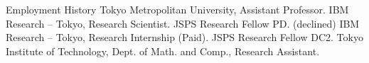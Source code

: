 \begin{rubric}{Employment History}
  \entry*[2023.04 -- now] Tokyo Metropolitan University, Assistant Professor.
  \entry*[2023.04 -- 2024.03] IBM Research -- Tokyo, Research Scientist.
  \entry*[2023.04 -- 2023.04] JSPS Research Fellow PD. (declined)
  \entry*[2021.08 -- 2021.10] IBM Research -- Tokyo, Research Internship (Paid).
  \entry*[2021.04 -- 2023.03] JSPS Research Fellow DC2.
  \entry*[2020.11 -- 2023.03] Tokyo Institute of Technology, Dept. of Math. and Comp.,
  Research Assistant.
\end{rubric}
